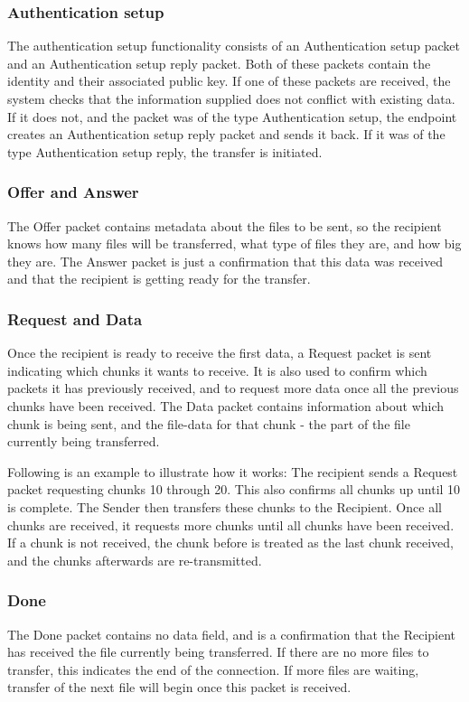 	\subsubsection*{Authentication setup}
	The authentication setup functionality consists of an Authentication setup packet and an Authentication setup reply packet. Both of these packets contain the identity and their associated public key. If one of these packets are received, the system checks that the information supplied does not conflict with existing data. If it does not, and the packet was of the type Authentication setup, the endpoint creates an Authentication setup reply packet and sends it back. If it was of the type Authentication setup reply, the transfer is initiated.

	\subsubsection*{Offer and Answer}
	The Offer packet contains metadata about the files to be sent, so the recipient knows how many files will be transferred, what type of files they are, and how big they are. The Answer packet is just a confirmation that this data was received and that the recipient is getting ready for the transfer.

	\subsubsection*{Request and Data}
	Once the recipient is ready to receive the first data, a Request packet is sent indicating which chunks it wants to receive. It is also used to confirm which packets it has previously received, and to request more data once all the previous chunks have been received. The Data packet contains information about which chunk is being sent, and the file-data for that chunk - the part of the file currently being transferred.

	Following is an example to illustrate how it works: The recipient sends a Request packet requesting chunks 10 through 20. This also confirms all chunks up until 10 is complete. The Sender then transfers these chunks to the Recipient. Once all chunks are received, it requests more chunks until all chunks have been received. If a chunk is not received, the chunk before is treated as the last chunk received, and the chunks afterwards are re-transmitted.

	\subsubsection*{Done}
	The Done packet contains no data field, and is a confirmation that the Recipient has received the file currently being transferred. If there are no more files to transfer, this indicates the end of the connection. If more files are waiting, transfer of the next file will begin once this packet is received.

